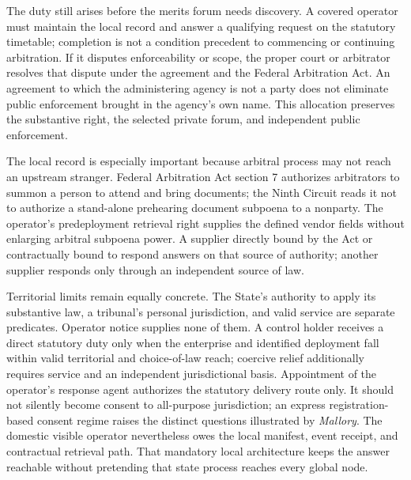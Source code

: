 The duty still arises before the merits forum needs discovery. A covered operator must maintain the local record and answer a qualifying request on the statutory timetable; completion is not a condition precedent to commencing or continuing arbitration. If it disputes enforceability or scope, the proper court or arbitrator resolves that dispute under the agreement and the Federal Arbitration Act. An agreement to which the administering agency is not a party does not eliminate public enforcement brought in the agency's own name. This allocation preserves the substantive right, the selected private forum, and independent public enforcement.

The local record is especially important because arbitral process may not reach an upstream stranger. Federal Arbitration Act section 7 authorizes arbitrators to summon a person to attend and bring documents; the Ninth Circuit reads it not to authorize a stand-alone prehearing document subpoena to a nonparty. The operator's predeployment retrieval right supplies the defined vendor fields without enlarging arbitral subpoena power. A supplier directly bound by the Act or contractually bound to respond answers on that source of authority; another supplier responds only through an independent source of law.

Territorial limits remain equally concrete. The State's authority to apply its substantive law, a tribunal's personal jurisdiction, and valid service are separate predicates. Operator notice supplies none of them. A control holder receives a direct statutory duty only when the enterprise and identified deployment fall within valid territorial and choice-of-law reach; coercive relief additionally requires service and an independent jurisdictional basis. Appointment of the operator's response agent authorizes the statutory delivery route only. It should not silently become consent to all-purpose jurisdiction; an express registration-based consent regime raises the distinct questions illustrated by \emph{Mallory}. The domestic visible operator nevertheless owes the local manifest, event receipt, and contractual retrieval path. That mandatory local architecture keeps the answer reachable without pretending that state process reaches every global node.

